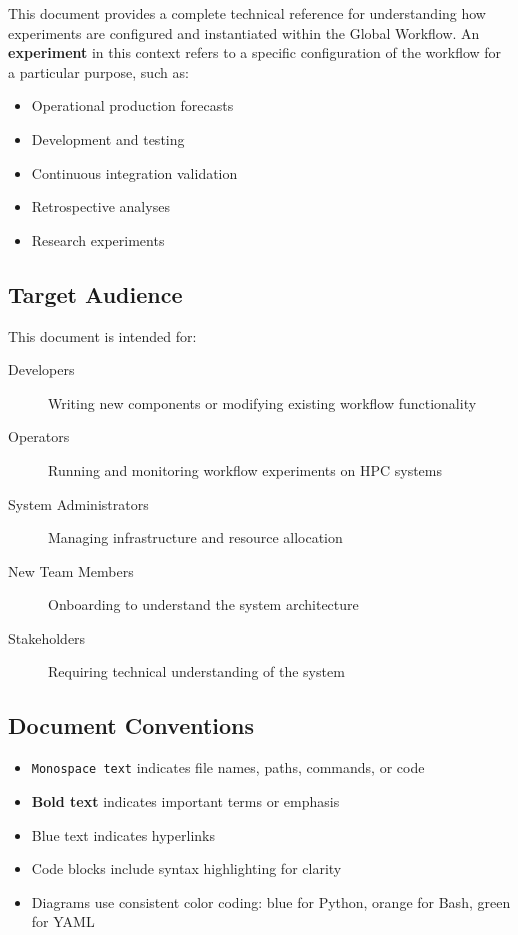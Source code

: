 \documentclass[11pt,letterpaper]{article}
\begin{document}
This document provides a complete technical reference for understanding how experiments are configured and instantiated within the Global Workflow. An \textbf{experiment} in this context refers to a specific configuration of the workflow for a particular purpose, such as:

\begin{itemize}
    \item Operational production forecasts
    \item Development and testing
    \item Continuous integration validation
    \item Retrospective analyses
    \item Research experiments
\end{itemize}

\subsection{Target Audience}

This document is intended for:

\begin{description}
    \item[Developers] Writing new components or modifying existing workflow functionality
    \item[Operators] Running and monitoring workflow experiments on HPC systems
    \item[System Administrators] Managing infrastructure and resource allocation
    \item[New Team Members] Onboarding to understand the system architecture
    \item[Stakeholders] Requiring technical understanding of the system
\end{description}

\subsection{Document Conventions}

\begin{itemize}
    \item \texttt{Monospace text} indicates file names, paths, commands, or code
    \item \textbf{Bold text} indicates important terms or emphasis
    \item \textcolor{NOAABlue}{Blue text} indicates hyperlinks
    \item Code blocks include syntax highlighting for clarity
    \item Diagrams use consistent color coding: blue for Python, orange for Bash, green for YAML
\end{itemize}
\end{document}
